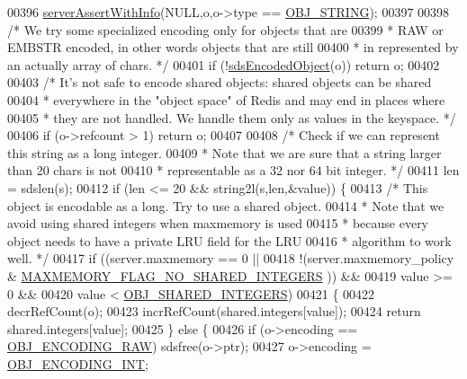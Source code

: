 \begin{DoxyCode}
00396     \hyperlink{server_8h_a7308f76cbff9a8d3797fe78190b91282}{serverAssertWithInfo}(NULL,o,o->type == \hyperlink{server_8h_a65236ea160f69cdef33ec942092af88f}{OBJ\_STRING});
00397 
00398     \textcolor{comment}{/* We try some specialized encoding only for objects that are}
00399 \textcolor{comment}{     * RAW or EMBSTR encoded, in other words objects that are still}
00400 \textcolor{comment}{     * in represented by an actually array of chars. */}
00401     \textcolor{keywordflow}{if} (!\hyperlink{server_8h_afcfb5bd97af52d1dbce331745cae030c}{sdsEncodedObject}(o)) \textcolor{keywordflow}{return} o;
00402 
00403     \textcolor{comment}{/* It's not safe to encode shared objects: shared objects can be shared}
00404 \textcolor{comment}{     * everywhere in the "object space" of Redis and may end in places where}
00405 \textcolor{comment}{     * they are not handled. We handle them only as values in the keyspace. */}
00406      \textcolor{keywordflow}{if} (o->refcount > 1) \textcolor{keywordflow}{return} o;
00407 
00408     \textcolor{comment}{/* Check if we can represent this string as a long integer.}
00409 \textcolor{comment}{     * Note that we are sure that a string larger than 20 chars is not}
00410 \textcolor{comment}{     * representable as a 32 nor 64 bit integer. */}
00411     len = sdslen(s);
00412     \textcolor{keywordflow}{if} (len <= 20 && string2l(s,len,&value)) \{
00413         \textcolor{comment}{/* This object is encodable as a long. Try to use a shared object.}
00414 \textcolor{comment}{         * Note that we avoid using shared integers when maxmemory is used}
00415 \textcolor{comment}{         * because every object needs to have a private LRU field for the LRU}
00416 \textcolor{comment}{         * algorithm to work well. */}
00417         \textcolor{keywordflow}{if} ((server.maxmemory == 0 ||
00418             !(server.maxmemory\_policy & \hyperlink{server_8h_a15f4654e0f62585fa6ea50ede84598d5}{MAXMEMORY\_FLAG\_NO\_SHARED\_INTEGERS}
      )) &&
00419             value >= 0 &&
00420             value < \hyperlink{server_8h_a311fc8b18b93af94e1ad418f1386b519}{OBJ\_SHARED\_INTEGERS})
00421         \{
00422             decrRefCount(o);
00423             incrRefCount(shared.integers[value]);
00424             \textcolor{keywordflow}{return} shared.integers[value];
00425         \} \textcolor{keywordflow}{else} \{
00426             \textcolor{keywordflow}{if} (o->encoding == \hyperlink{server_8h_a148bc85e3074e324a6dc5eebcad1bcd5}{OBJ\_ENCODING\_RAW}) sdsfree(o->ptr);
00427             o->encoding = \hyperlink{server_8h_ae934cf008a0be0ef009c92c2d006a816}{OBJ\_ENCODING\_INT};

\end{DoxyCode}

